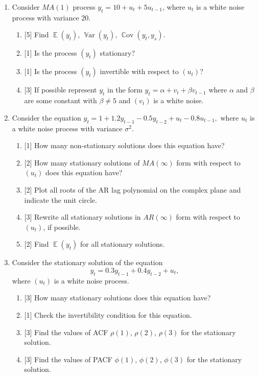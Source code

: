 \documentclass[12pt]{article}
\DeclareMathOperator{\Cov}{\mathbb{C}ov}
\DeclareMathOperator{\Var}{\mathbb{V}ar}
\DeclareMathOperator{\E}{\mathbb{E}}
\begin{document}
\begin{enumerate}
\item Consider $MA(1)$ process $y_t = 10 + u_t + 5 u_{t-1}$, where $u_t$ is a white noise process with variance $20$.
\begin{enumerate}
    \item {[5]} Find $\E(y_t)$, $\Var(y_t)$, $\Cov(y_t, y_s)$.
    \item {[1]} Is the process $(y_t)$ stationary?
    \item {[1]} Is the process $(y_t)$  invertible with respect to $(u_t)$?
    \item {[3]} If possible represent $y_t$ in the form $y_t = \alpha + v_t + \beta v_{t-1}$ where $\alpha$ and $\beta$ are some constant with $\beta \neq 5$ and $(v_t)$ is a white noise. 
\end{enumerate}

\newpage
\item Consider the equation
\(
y_t = 1 + 1.2 y_{t-1} - 0.5 y_{t-2} + u_t - 0.8 u_{t-1},
\)
where \( u_t \) is a white noise process with variance $\sigma^2$.
\begin{enumerate}
    \item {[1]} How many non-stationary solutions does this equation have?
    \item {[2]} How many stationary solutions of $MA(\infty)$ form with respect to $(u_t)$ does this equation have? 
    \item {[2]} Plot all roots of the AR lag polynomial on the complex plane and indicate the unit circle.
    \item {[3]} Rewrite all stationary solutions in $AR(\infty)$ form with respect to $(u_t)$, if possible.  
    \item {[2]} Find $\E(y_t)$ for all stationary solutions.
\end{enumerate}
\item   Consider the stationary solution of the equation
\[
y_t = 0.3 y_{t-1} + 0.4 y_{t-2} + u_t, 
\]
where $(u_t)$ is a white noise process. 
\begin{enumerate}
    \item {[3]} How many stationary solutions does this equation have?
    \item {[1]} Check the invertibility condition for this equation.
    \item {[3]} Find the values of ACF $\rho(1)$, $\rho(2)$, $\rho(3)$ for the stationary solution.
    \item {[3]} Find the values of PACF $\phi(1)$, $\phi(2)$, $\phi(3)$  for the stationary solution.
\end{enumerate}


\end{enumerate}
\end{document}
